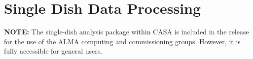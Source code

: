 

\chapter[Single Dish Data Processing]{Single Dish Data Processing}
\label{chapter:sd}


{\bf NOTE:} The single-dish analysis package within CASA 
is included in the release for the use
of the ALMA computing and commissioning groups.  
However, it is fully accessible for general users.

